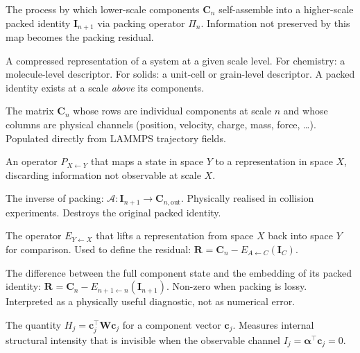 \documentclass[11pt, a4paper, oneside]{article}
\newcommand{\Pack}[1]{\Pi_{#1}}
\newcommand{\Ann}{\mathcal{A}}
\newcommand{\Comp}[1]{\mathbf{C}_{#1}}
\newcommand{\Ident}[1]{\mathbf{I}_{#1}}
\newcommand{\Resid}[1]{\mathbf{R}_{#1}}
\newcommand{\Embed}[2]{E_{#2 \leftarrow #1}}
\begin{document}
\begin{description}[style=nextline, leftmargin=3.5cm, labelwidth=3.2cm]

  \item[Scale packing]
	The process by which lower-scale components
	$\Comp{n}$ self-assemble into a higher-scale packed identity
	$\Ident{n+1}$ via packing operator $\Pack{n}$.
	Information not preserved by this map becomes the packing residual.

  \item[Packed identity]
	A compressed representation of a system at a given scale level.
	For chemistry: a molecule-level descriptor.
	For solids: a unit-cell or grain-level descriptor.
	A packed identity exists at a scale \emph{above} its components.

  \item[Component matrix]
	The matrix $\Comp{n}$ whose rows are individual components at
	scale $n$ and whose columns are physical channels
	(position, velocity, charge, mass, force, \ldots).
	Populated directly from LAMMPS trajectory fields.

  \item[Projection operator]
	An operator $P_{X \leftarrow Y}$ that maps a state in space $Y$
	to a representation in space $X$, discarding information not
	observable at scale $X$.

  \item[Annihilation map]
	The inverse of packing: $\Ann: \Ident{n+1} \to \Comp{n,\mathrm{out}}$.
	Physically realised in collision experiments.
	Destroys the original packed identity.

  \item[Embedding operator]
	The operator $E_{Y \leftarrow X}$ that lifts a representation
	from space $X$ back into space $Y$ for comparison.
	Used to define the residual:
	$\Resid{} = \Comp{n} - \Embed{C}{A}(\Ident{C})$.

  \item[Residual]
	The difference between the full component state and the
	embedding of its packed identity:
	$\Resid{} = \Comp{n} - \Embed{n}{n+1}(\Ident{n+1})$.
	Non-zero when packing is lossy.
	Interpreted as a physically useful diagnostic,
	not as numerical error.

  \item[Hidden column activity]
	The quantity $H_j = \mathbf{c}_j^\top \mathbf{W} \mathbf{c}_j$
	for a component vector $\mathbf{c}_j$.
	Measures internal structural intensity that is invisible
	when the observable channel $I_j = \bm{\alpha}^\top \mathbf{c}_j = 0$.


\end{description}
\end{document}
